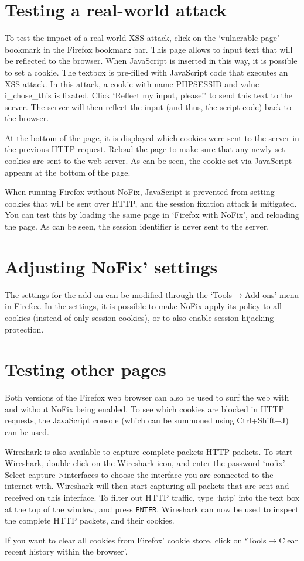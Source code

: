 \section{Testing a real-world attack}

To test the impact of a real-world XSS attack, click on the `vulnerable page' bookmark in the Firefox bookmark bar. This page allows to input text that will be reflected to the browser. When JavaScript is inserted in this way, it is possible to set a cookie. The textbox is pre-filled with JavaScript code that executes an XSS attack. In this attack, a cookie with name PHPSESSID and value i_chose_this is fixated. Click `Reflect my input, please!' to send this text to the server. The server will then reflect the input (and thus, the script code) back to the browser.

At the bottom of the page, it is displayed which cookies were sent to the server in the previous HTTP request. Reload the page to make sure that any newly set cookies are sent to the web server. As can be seen, the cookie set via JavaScript appears at the bottom of the page.

When running Firefox without NoFix, JavaScript is prevented from setting cookies that will be sent over HTTP, and the session fixation attack is mitigated. You can test this by loading the same page in `Firefox with NoFix', and reloading the page. As can be seen, the session identifier is never sent to the server.

\section{Adjusting NoFix' settings}

The settings for the add-on can be modified through the `Tools$\rightarrow$Add-ons' menu in Firefox. In the settings, it is possible to make NoFix apply its policy to all cookies (instead of only session cookies), or to also enable session hijacking protection.

\section{Testing other pages}

Both versions of the Firefox web browser can also be used to surf the web with and without NoFix being enabled. To see which cookies are blocked in HTTP requests, the JavaScript console (which can be summoned using Ctrl+Shift+J) can be used.

Wireshark is also available to capture complete packets HTTP packets. To start Wireshark, double-click on the Wireshark icon, and enter the password `nofix'. Select capture->interfaces to choose the interface you are connected to the internet with. Wireshark will then start capturing all packets that are sent and received on this interface. To filter out HTTP traffic, type `http' into the text box at the top of the window, and press \texttt{ENTER}. Wireshark can now be used to inspect the complete HTTP packets, and their cookies.

If you want to clear all cookies from Firefox' cookie store, click on `Tools$\rightarrow$Clear recent history within the browser'.
